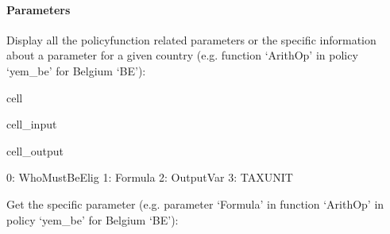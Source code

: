 \documentclass[letterpaper,10pt,english]{sphinxmanual}
\begin{document}
\paragraph{Parameters}
\label{\detokenize{userguide:parameters}}
\sphinxAtStartPar
Display all the policy\sphinxhyphen{}function related parameters or the specific information about a parameter for a given country (e.g. function ‘ArithOp’ in policy ‘yem\_be’ for Belgium ‘BE’):

\begin{sphinxuseclass}{cell}
\begin{sphinxuseclass}{cell_input}
\begin{sphinxVerbatim}[commandchars=\\\{\}]
\PYG{p}{[}\PYG{p}{]}\PYG{p}{[}\PYG{p}{]}\PYG{p}{[}\PYG{p}{]}
\end{sphinxVerbatim}

\end{sphinxuseclass}
\begin{sphinxuseclass}{cell_output}
\begin{sphinxVerbatim}[commandchars=\\\{\}]
0: Who\PYGZus{}Must\PYGZus{}Be\PYGZus{}Elig
1: Formula         
2: Output\PYGZus{}Var      
3: TAX\PYGZus{}UNIT        
\end{sphinxVerbatim}

\end{sphinxuseclass}
\end{sphinxuseclass}
\sphinxAtStartPar
Get the specific parameter (e.g. parameter ‘Formula’ in function ‘ArithOp’ in policy ‘yem\_be’ for Belgium ‘BE’):
\end{document}
